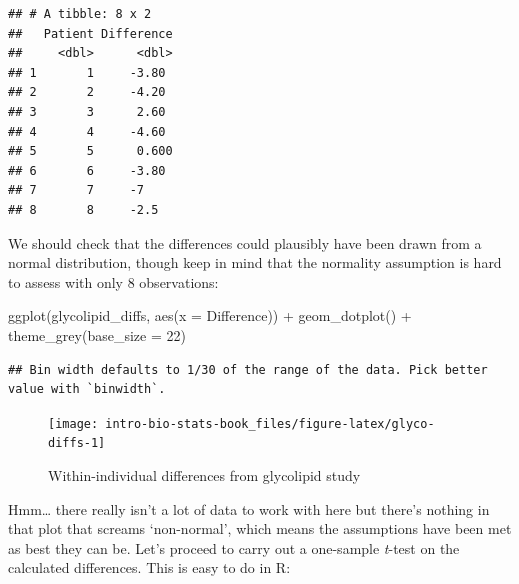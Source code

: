 \documentclass[
]{book}
\newenvironment{Shaded}{\begin{snugshade}}{\end{snugshade}}
\newcommand{\AttributeTok}[1]{\textcolor[rgb]{0.77,0.63,0.00}{#1}}
\newcommand{\DecValTok}[1]{\textcolor[rgb]{0.00,0.00,0.81}{#1}}
\newcommand{\FunctionTok}[1]{\textcolor[rgb]{0.00,0.00,0.00}{#1}}
\newcommand{\NormalTok}[1]{#1}
\newcommand{\SpecialCharTok}[1]{\textcolor[rgb]{0.00,0.00,0.00}{#1}}
\begin{document}
\begin{verbatim}
## # A tibble: 8 x 2
##   Patient Difference
##     <dbl>      <dbl>
## 1       1     -3.80 
## 2       2     -4.20 
## 3       3      2.60 
## 4       4     -4.60 
## 5       5      0.600
## 6       6     -3.80 
## 7       7     -7    
## 8       8     -2.5
\end{verbatim}

We should check that the differences could plausibly have been drawn from a normal distribution, though keep in mind that the normality assumption is hard to assess with only 8 observations:

\begin{Shaded}
\begin{Highlighting}[]
\FunctionTok{ggplot}\NormalTok{(glycolipid\_diffs, }\FunctionTok{aes}\NormalTok{(}\AttributeTok{x =}\NormalTok{ Difference)) }\SpecialCharTok{+}
  \FunctionTok{geom\_dotplot}\NormalTok{() }\SpecialCharTok{+} \FunctionTok{theme\_grey}\NormalTok{(}\AttributeTok{base\_size =} \DecValTok{22}\NormalTok{)}
\end{Highlighting}
\end{Shaded}

\begin{verbatim}
## Bin width defaults to 1/30 of the range of the data. Pick better value with `binwidth`.
\end{verbatim}

\begin{figure}

{\centering \texttt{[image: intro-bio-stats-book\_files/figure-latex/glyco-diffs-1]} 

}

\caption{Within-individual differences from glycolipid study}\label{fig:glyco-diffs}
\end{figure}

Hmm\ldots{} there really isn't a lot of data to work with here but there's nothing in that plot that screams `non-normal', which means the assumptions have been met as best they can be. Let's proceed to carry out a one-sample \emph{t}-test on the calculated differences. This is easy to do in R:

\begin{Shaded}
\end{Shaded}
\end{document}
